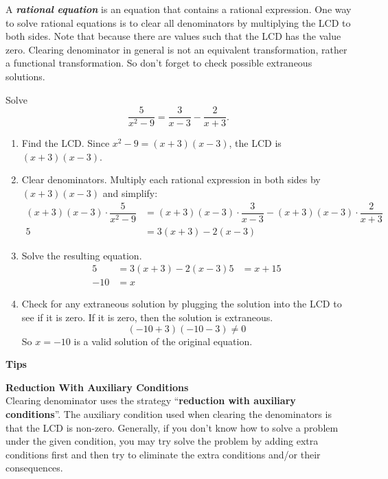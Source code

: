 \documentclass[en,12pt]{elegantbook}
\providecommand{\tightlist}{%
  \setlength{\itemsep}{0pt}\setlength{\parskip}{0pt}}
\newenvironment{rmdtip}{
	\par\noindent
	{
		\makebox[-\width][r]{
			\footnotesize\color{red!90}
            \HandRight
			\hspace*{1pt}
		}
			\textbf{
				\color{second}
				\hspace*{3pt}
				Tips 
			}
    }
    \begin{shaded}
    \sffamily
}{
    \par\medskip\ignorespacesafterend
    \end{shaded}
}
\providecommand{\tightlist}{%
  \setlength{\itemsep}{0pt}\setlength{\parskip}{0pt}}
\let\BeginKnitrBlock\begin \let\EndKnitrBlock\end
\begin{document}
A \textbf{\emph{rational equation}} is an equation that contains a rational expression. One way to solve rational equations is to clear all denominators by multiplying the LCD to both sides. Note that because there are values such that the LCD has the value zero. Clearing denominator in general is not an equivalent transformation, rather a functional transformation. So don't forget to check possible extraneous solutions.

\BeginKnitrBlock{example}
\protect\hypertarget{exm:unnamed-chunk-143}{}{\label{exm:unnamed-chunk-143} }
Solve
\[
\dfrac{5}{x^2-9}=\dfrac{3}{x-3}-\dfrac{2}{x+3}.
\]
\EndKnitrBlock{example}

\BeginKnitrBlock{solution}


\begin{enumerate}
\def\labelenumi{\arabic{enumi}.}
\tightlist
\item
  Find the LCD.
  Since \(x^2-9=(x+3)(x-3)\), the LCD is \((x+3)(x-3)\).
\item
  Clear denominators.
  Multiply each rational expression in both sides by \((x+3)(x-3)\) and simplify:
  \[
       \begin{aligned}
           (x+3)(x-3)\cdot\dfrac{5}{x^2-9}&=(x+3)(x-3)\cdot\dfrac{3}{x-3}-(x+3)(x-3)\cdot\dfrac{2}{x+3}\\
           5&=3(x+3)-2(x-3)
       \end{aligned}
   \]
\item
  Solve the resulting equation.
  \[
       \begin{aligned}
           5&=3(x+3)-2(x-3)
           5&=x+15\\
           -10&=x
       \end{aligned}
   \]
\item
  Check for any extraneous solution by plugging the solution into the LCD to see if it is zero. If it is zero, then the solution is extraneous.
  \[
       (-10+3)(-10-3)\neq 0
   \]
  So \(x=-10\) is a valid solution of the original equation.
\end{enumerate}
\EndKnitrBlock{solution}

\begin{rmdtip}

\textbf{Reduction With Auxiliary Conditions}\\
Clearing denominator uses the strategy ``\textbf{reduction with auxiliary conditions}''. The auxiliary condition used when clearing the denominators is that the LCD is non-zero. Generally, if you don't know how to solve a problem under the given condition, you may try solve the problem by adding extra conditions first and then try to eliminate the extra conditions and/or their consequences.

\end{rmdtip}
\end{document}
